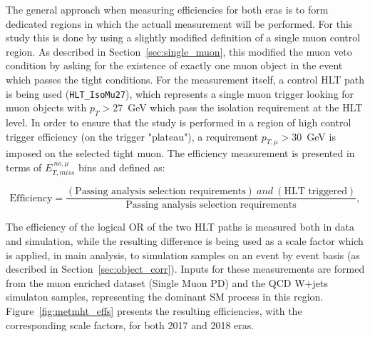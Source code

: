 \hspace{10pt} The general approach when measuring efficiencies for both eras is to form dedicated regions in which the actuall measurement will be performed. For this study this is done by using a slightly modified definition of a single muon control region. As described in Section~\ref{sec:single_muon}, this modified the muon veto condition by asking for the existence of exactly one muon object in the event which passes the tight conditions. For the measurement itself, a control HLT path is being used (\texttt{HLT\_IsoMu27}), which represents a single muon trigger looking for muon objects with $p_T>$27~GeV which pass the isolation requirement at the HLT level. In order to ensure that the study is performed in a region of high control trigger efficiency (on the trigger "plateau"), a requirement $p_{T,\mu}>30$~GeV is imposed on the selected tight muon. The efficiency measurement is presented in terms of $E_{T,miss}^{~no,\mu}$ bins and defined as:

\begin{equation}
\text{Efficiency} = \frac{(\text{Passing analysis selection requirements})~and~(\text{HLT triggered})}{\text{Passing analysis selection requirements}},
\end{equation}

The efficiency of the logical OR of the two HLT paths is measured both in data and simulation, while the resulting difference is being used as a scale factor which is applied, in main analysis, to simulation samples on an event by event basis (as described in Section~\ref{sec:object_corr}). Inputs for these measurements are formed from the muon enriched dataset (Single Muon PD) and the QCD W+jets simulaton samples, representing the dominant SM process in this region. Figure~\ref{fig:metmht_effs} presents the resulting efficiencies, with the corresponding scale factors, for both 2017 and 2018 eras.

